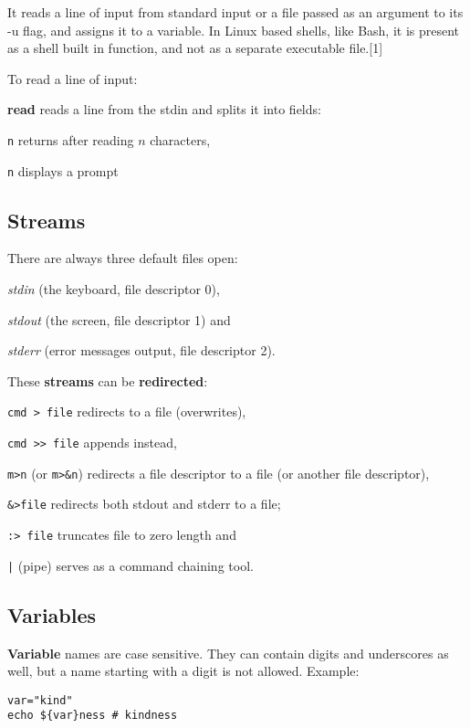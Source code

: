  It reads a line of input from standard input or a file passed as an argument to its -u flag, and assigns it to a variable. In Linux based shells, like Bash, it is present as a shell built in function, and not as a separate executable file.[1]

To read a line of input:
\begin{enumx}
\item [\cmd] \textbf{read} reads a line from the stdin and splits it into fields:
\item [\texttt{n}] returns after reading $n$ characters, 
\item [\texttt{n}] displays a prompt 
\end{enumx}

\subsection{Streams}
There are always three default files open:
\begin{enumx}
\item \emph{stdin} (the keyboard, file descriptor 0),
\item \emph{stdout} (the screen, file descriptor 1) and
\item \emph{stderr} (error messages output, file descriptor 2).
\end{enumx}

These \textbf{streams} can be \textbf{redirected}:
\begin{itemx} 
\item \texttt{cmd > file} redirects to a file (overwrites),
\item \texttt{cmd >{}> file} appends instead,
\item \texttt{m>n} (or \texttt{m>\&n}) redirects a file descriptor to a file 
(or another file descriptor), 
\item \texttt{\&>file} redirects both stdout and stderr to a file;
\item \texttt{:> file} truncates file to zero length and
\item \texttt{|} (pipe) serves as a command chaining tool.
\end{itemx}

\subsection{Variables}
\textbf{Variable} names are case sensitive.
They can contain digits and underscores as well,
but a name starting with a digit is not allowed.
Example: 
\begin{verbatim}
var="kind"
echo ${var}ness # kindness
\end{verbatim}

